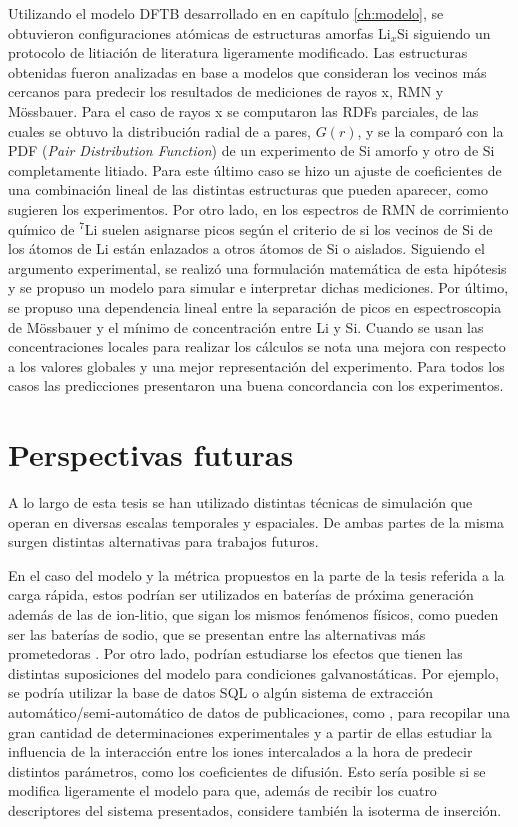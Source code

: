 Utilizando el modelo DFTB desarrollado en en capítulo \ref{ch:modelo}, se 
obtuvieron configuraciones atómicas de estructuras amorfas Li$_x$Si siguiendo un 
protocolo de litiación de literatura ligeramente modificado. Las estructuras 
obtenidas fueron analizadas en base a modelos que consideran los vecinos más 
cercanos para predecir los resultados de mediciones de rayos x, RMN y Mössbauer.
Para el caso de rayos x se computaron las RDFs parciales, de las cuales se obtuvo
la distribución radial de a pares, $G(r)$, y se la comparó con la PDF 
(\textit{Pair Distribution Function}) de un experimento de Si amorfo y otro de Si
completamente litiado. Para este último caso se hizo un ajuste de coeficientes de 
una combinación lineal de las distintas estructuras que pueden aparecer, como 
sugieren los experimentos. Por otro lado, en los espectros de RMN de corrimiento 
químico de $^7$Li suelen asignarse picos según el criterio de si los vecinos de Si de los átomos de Li están
enlazados a otros átomos de Si o aislados. Siguiendo el argumento experimental, se realizó una 
formulación matemática de esta hipótesis y se propuso un modelo para simular e 
interpretar dichas mediciones. Por último, se propuso una dependencia lineal 
entre la separación de picos en espectroscopia de Mössbauer y el mínimo de 
concentración entre Li y Si. Cuando se usan las concentraciones locales para 
realizar los cálculos se nota una mejora con respecto a los valores globales y
una mejor representación del experimento. Para todos los casos las predicciones
presentaron una buena concordancia con los experimentos.

\section{Perspectivas futuras}

A lo largo de esta tesis se han utilizado distintas técnicas de simulación que
operan en diversas escalas temporales y espaciales. De ambas partes de la misma
surgen distintas alternativas para trabajos futuros.

En el caso del modelo y la métrica propuestos en la parte de la tesis referida a 
la carga rápida, estos podrían ser utilizados en baterías de 
próxima generación además de las de ion-litio, que sigan los mismos fenómenos
físicos, como pueden ser las baterías de sodio, que se presentan entre las 
alternativas más prometedoras \cite{morais2021titanium, leite2020electrochemistry}.
Por otro lado, podrían estudiarse los efectos que tienen las distintas 
suposiciones del modelo para condiciones galvanostáticas. Por ejemplo, se podría utilizar 
la base de datos SQL  \cite{wang2022review} o algún sistema de 
extracción automático/semi-automático de datos de publicaciones, como 
\cite{el2023libac}, para recopilar una gran cantidad de determinaciones 
experimentales y a partir de ellas estudiar la influencia de la interacción entre los iones 
intercalados a la hora de predecir distintos parámetros, como los coeficientes de 
difusión. Esto sería posible si se modifica ligeramente el modelo para que, además
de recibir los cuatro descriptores del sistema presentados, considere también
la isoterma de inserción.

